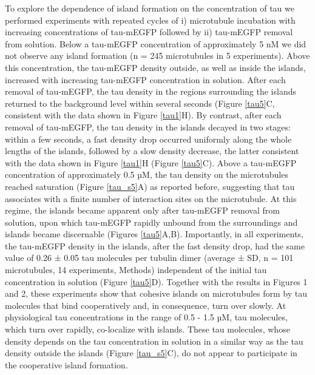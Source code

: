 To explore the dependence of island formation on the concentration of tau we performed experiments with repeated cycles of i) microtubule incubation with increasing concentrations of tau-mEGFP followed by ii) tau-mEGFP removal from solution. Below a tau-mEGFP concentration of approximately 5 nM we did not observe any island formation (n = 245 microtubules in 5 experiments). Above this concentration, the tau-mEGFP density outside, as well as inside the islands, increased with increasing tau-mEGFP concentration in solution. After each removal of tau-mEGFP, the tau density in the regions surrounding the islands returned to the background level within several seconds (Figure \ref{tau5}C, consistent with the data shown in Figure \ref{tau1}H). By contrast, after each removal of tau-mEGFP, the tau density in the islands decayed in two stages: within a few seconds, a fast density drop occurred uniformly along the whole lengths of the islands, followed by a slow density decrease, the latter consistent with the data shown in Figure \ref{tau1}H (Figure \ref{tau5}C). Above a tau-mEGFP concentration of approximately 0.5 µM, the tau density on the microtubules reached saturation (Figure \ref{tau_s5}A) as reported before\parencite{Makrides2004}, suggesting that tau associates with a finite number of interaction sites on the microtubule. At this regime, the islands became apparent only after tau-mEGFP removal from solution, upon which tau-mEGFP rapidly unbound from the surroundings and islands became discernable (Figures \ref{tau5}A,B). Importantly, in all experiments, the tau-mEGFP density in the islands, after the fast density drop, had the same value of 0.26 ± 0.05 tau molecules per tubulin dimer (average ± SD, n = 101 microtubules, 14 experiments, Methods) independent of the initial tau concentration in solution (Figure \ref{tau5}D). Together with the results in Figures 1 and 2, these experiments show that cohesive islands on microtubules form by tau molecules that bind cooperatively and, in consequence, turn over slowly. At physiological tau concentrations\parencite{Wegmann} in the range of 0.5 - 1.5 µM, tau molecules, which turn over rapidly, co-localize with islands. These tau molecules, whose density depends on the tau concentration in solution in a similar way as the tau density outside the islands (Figure \ref{tau_s5}C), do not appear to participate in the cooperative island formation.

